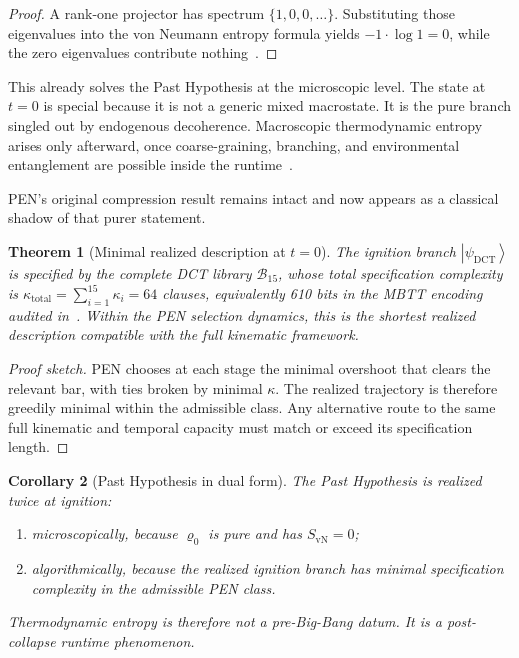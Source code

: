 \documentclass[11pt,a4paper]{article}
\theoremstyle{plain}
\newtheorem{theorem}{Theorem}[section]
\newtheorem{corollary}[theorem]{Corollary}
\theoremstyle{definition}
\theoremstyle{remark}
\newcommand{\B}{\mathcal{B}}
\newcommand{\SvN}{S_{\mathrm{vN}}}
\providecommand{\ket}[1]{\left|#1\right\rangle}
\begin{document}
\begin{proof}
A rank-one projector has spectrum $\{1,0,0,\ldots\}$.
Substituting those eigenvalues into the von Neumann entropy formula yields $-1\cdot\log 1 = 0$, while the zero eigenvalues contribute nothing~\cite{von-neumann}.
\end{proof}

This already solves the Past Hypothesis at the microscopic level.
The state at $t=0$ is special because it is not a generic mixed macrostate.
It is the pure branch singled out by endogenous decoherence.
Macroscopic thermodynamic entropy arises only afterward, once coarse-graining, branching, and environmental entanglement are possible inside the runtime~\cite{zurek-decoherence,schlosshauer}.

PEN's original compression result remains intact and now appears as a classical shadow of that purer statement.

\begin{theorem}[Minimal realized description at \texorpdfstring{$t = 0$}{t = 0}]
\label{thm:past-hypothesis}
The ignition branch $\ket{\psi_{\mathrm{DCT}}}$ is specified by the complete DCT library $\B_{15}$, whose total specification complexity is $\kappa_{\mathrm{total}} = \sum_{i=1}^{15}\kappa_i = 64$ clauses, equivalently 610 bits in the MBTT encoding audited in~\cite{pen}.
Within the PEN selection dynamics, this is the shortest realized description compatible with the full kinematic framework.
\end{theorem}

\begin{proof}[Proof sketch]
PEN chooses at each stage the minimal overshoot that clears the relevant bar, with ties broken by minimal $\kappa$.
The realized trajectory is therefore greedily minimal within the admissible class.
Any alternative route to the same full kinematic and temporal capacity must match or exceed its specification length.
\end{proof}

\begin{corollary}[Past Hypothesis in dual form]
\label{cor:zurek-past}
The Past Hypothesis is realized twice at ignition:
\begin{enumerate}[label=(\roman*), nosep]
    \item microscopically, because $\varrho_0$ is pure and has $\SvN = 0$;
    \item algorithmically, because the realized ignition branch has minimal specification complexity in the admissible PEN class.
\end{enumerate}
Thermodynamic entropy is therefore not a pre-Big-Bang datum.
It is a post-collapse runtime phenomenon.
\end{corollary}
\end{document}
